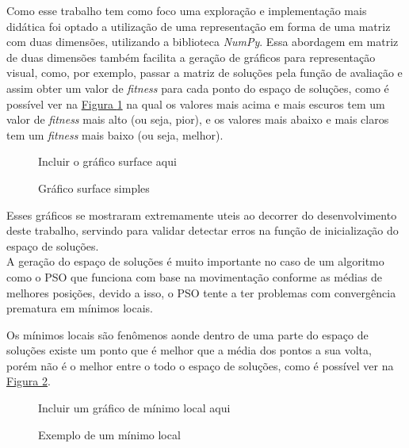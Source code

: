             Como esse trabalho tem como foco uma exploração e implementação mais didática foi optado a utilização de uma representação em forma de uma matriz com duas dimensões, utilizando a biblioteca \textit{NumPy}. Essa abordagem em matriz de duas dimensões também facilita a geração de gráficos para representação visual, como, por exemplo, passar a matriz de soluções pela função de avaliação e assim obter um valor de \textit{fitness} para cada ponto do espaço de soluções, como é possível ver na 
            \hyperref[fig:surfaceplot]{Figura \ref{fig:surfaceplot}} 
            na qual os valores mais acima e mais escuros tem um valor de \textit{fitness} mais alto (ou seja, pior), e os valores mais abaixo e mais claros tem um \textit{fitness} mais baixo (ou seja, melhor).\hfill

            \begin{figure}[ht]
                \centering
                \small{Incluir o gráfico surface aqui}
                \caption{Gráfico surface simples}
                \label{fig:surfaceplot}
            \end{figure}

            Esses gráficos se mostraram extremamente uteis ao decorrer do desenvolvimento deste trabalho, servindo para validar detectar erros na função de inicialização do espaço de soluções.\\


            A geração do espaço de soluções é muito importante no caso de um algoritmo como o PSO 
            que funciona com base na movimentação conforme as médias de melhores posições, 
            devido a isso, o PSO tente a ter problemas com convergência prematura em mínimos locais.\hfill\vspace{\onelineskip}
            
            Os mínimos locais são fenômenos aonde dentro de uma parte do espaço de soluções existe um ponto que é melhor que a média dos pontos a sua volta, porém não é o melhor entre o todo o espaço de soluções, como é possível ver na \hyperref[fig:ex-minimolocal]{Figura \ref{fig:ex-minimolocal}}.\newline
            \begin{figure}[ht]
                \centering
                \small{Incluir um gráfico de mínimo local aqui}
                \caption{Exemplo de um mínimo local}
                \label{fig:ex-minimolocal}
            \end{figure}
            

